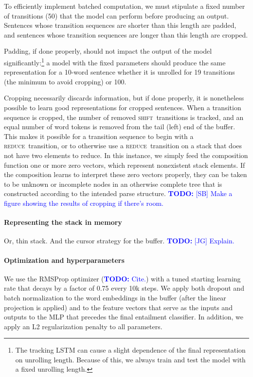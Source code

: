 \documentclass[11pt,letterpaper]{article}
\newcommand\todo[1]{\textcolor{blue}{\textbf{TODO:} #1}}
\newcommand{\shift}{\textsc{shift}}
\newcommand{\reduce}{\textsc{reduce}}
\begin{document}
To efficiently implement batched computation, we must stipulate a fixed number of transitions (50) that the model can perform before producing an output. Sentences whose transition sequences are shorter than this length are padded, and sentences whose transition sequences are longer than this length are cropped. 

Padding, if done properly, should not impact the output of the model significantly:\footnote{The tracking LSTM can cause a slight dependence of the final representation on unrolling length. Because of this, we always train and test the model with a fixed unrolling length.} a model with the fixed parameters should produce the same representation for a 10-word sentence whether it is unrolled for 19 transitions (the minimum to avoid cropping) or 100.

Cropping necessarily discards information, but if done properly, it is nonetheless possible to learn good representations for cropped sentences. When a transition sequence is cropped, the number of removed \shift~transitions is tracked, and an equal number of word tokens is removed from the tail (left) end of the buffer. This makes it possible for a transition sequence to begin with a \reduce~transition, or to otherwise use a \reduce~transition on a stack that does not have two elements to reduce. In this instance, we simply feed the composition function one or more zero vectors, which represent nonexistent stack elements. If the composition learns to interpret these zero vectors properly, they can be taken to be unknown or incomplete nodes in an otherwise complete tree that is constructed according to the intended parse structure. \todo{[SB] Make a figure showing the results of cropping if there's room.}

\paragraph{Representing the stack in memory} Or, thin stack. And the cursor strategy for the buffer. 
\todo{[JG] Explain.}

\vspace{8em}

\paragraph{Optimization and hyperparameters}

We use the RMSProp optimizer (\todo{Cite.}) with a tuned starting learning rate that decays by a factor of 0.75 every 10k steps. We apply both dropout \cite{srivastava2014dropout} and batch normalization \cite{2015SIoffeCSzegedy} to the word embeddings in the buffer (after the linear projection is applied) and to the feature vectors that serve as the inputs and outputs to the MLP that precedes the final entailment classifier. In addition, we apply an L2 regularization penalty to all parameters.
\end{document}
